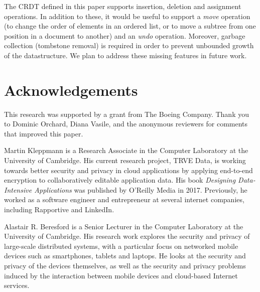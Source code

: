 \documentclass[10pt,journal,compsoc]{IEEEtran}
\begin{document}
The CRDT defined in this paper supports insertion, deletion and assignment operations. In addition to these, it would be useful to support a \emph{move} operation (to change the order of elements in an ordered list, or to move a subtree from one position in a document to another) and an \emph{undo} operation. Moreover, garbage collection (tombstone removal) is required in order to prevent unbounded growth of the datastructure. We plan to address these missing features in future work.

\section*{Acknowledgements}

This research was supported by a grant from The Boeing Company. Thank you to Dominic Orchard, Diana Vasile, and the anonymous reviewers for comments that improved this paper.


{}
\vfill

\begin{IEEEbiography}{Martin Kleppmann}
is a Research Associate in the Computer Laboratory at the University of Cambridge. His current research project, TRVE Data, is working towards better security and privacy in cloud applications by applying end-to-end encryption to collaboratively editable application data. His book \emph{Designing Data-Intensive Applications} was published by O'Reilly Media in 2017. Previously, he worked as a software engineer and entrepreneur at several internet companies, including Rapportive and LinkedIn.
\end{IEEEbiography}

\begin{IEEEbiography}{Alastair R. Beresford}
is a Senior Lecturer in the Computer Laboratory at the University of Cambridge. His research work explores the security and privacy of large-scale distributed systems, with a particular focus on networked mobile devices such as smartphones, tablets and laptops. He looks at the security and privacy of the devices themselves, as well as the security and privacy problems induced by the interaction between mobile devices and cloud-based Internet services.
\end{IEEEbiography}
\end{document}
